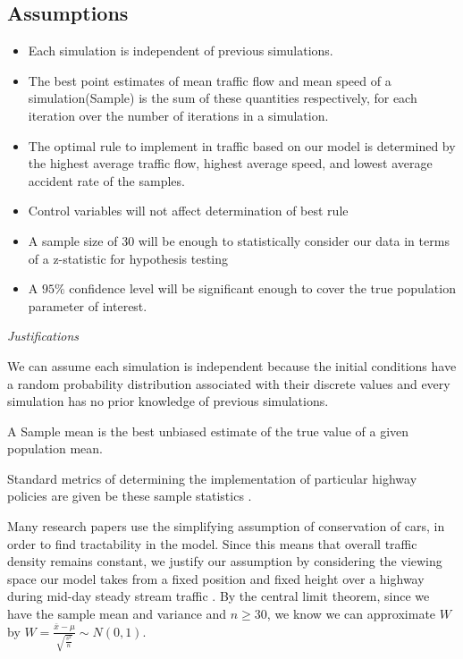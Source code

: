 \documentclass{amsart}
\begin{document}
	\subsection{Assumptions}
	\begin{itemize}
		\item Each simulation is independent of previous simulations.
		\item The best point estimates of mean traffic flow and mean speed of a simulation(Sample) is the sum of these quantities respectively, for each iteration over the number of iterations in a simulation.
		\item The optimal rule to implement in traffic based on our model is determined by the highest average traffic flow, highest average speed, and lowest average accident rate of the samples.
		\item Control variables will not affect determination of best rule
		\item A sample size of 30 will be enough to statistically consider our data in terms of a z-statistic for hypothesis testing
		\item A $95\%$ confidence level will be significant enough to cover the true population parameter of interest.
	\end{itemize}
	
	
	\textit{Justifications}
	
		We can assume each simulation is independent because the initial conditions have a random probability distribution associated with their discrete values and every simulation has no prior knowledge of previous simulations.

		A Sample mean is the best unbiased estimate of the true value of a given population mean.
		
		Standard metrics of determining the implementation of particular highway policies are given be these sample statistics \cite{elvik2009handbook}.

		Many research papers use the simplifying assumption of conservation of cars, in order to find tractability in the model. Since this means that overall traffic density remains constant, we justify our assumption by considering the viewing space our model takes from a fixed position and fixed height over a highway during mid-day steady stream traffic \cite{seiboldconstructing}.
		By the central limit theorem, since we have the sample mean and variance and $n \geq 30$, we know we can approximate $W$ by $W=\frac{\bar x - \mu}{\sqrt{\frac{s^2}{n}}} \sim N(0,1)$.
		
\end{document}
